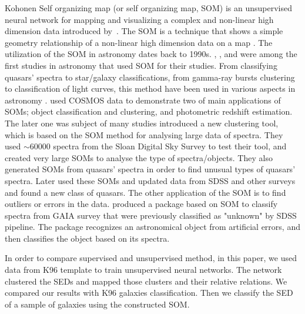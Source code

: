 Kohonen Self organizing map (or self organizing map, SOM) is an unsupervised neural network for mapping and visualizing a complex and non-linear high dimension data introduced by~\citep{Kohonen82}.
The SOM is a technique that shows a simple geometry relationship of a non-linear high dimension data on a map \citep{Kohonen98}.
The utilization of the SOM in astronomy dates back to 1990s. 
\citet[][]{Odewahn92}, \citet[][]{Hernandez94}, and \citet[][]{Murtagh95} were among the first studies in astronomy that used SOM for their studies.
From classifying quasars' spectra to star/galaxy classifications, from gamma-ray bursts clustering to classification of light curves, this method have been used in various aspects in astronomy \citep[e.g.][]{Maehoenen95, Miller96,Andreon00,Balastegui01,Rajaniemi02,Brett04,Scaringi09}.
\citet{Geach12} used COSMOS data to demonstrate two of main applications of SOMs; object classification and clustering, and photometric redshift estimation. 
The later one was subject of many studies \citep[e.g.][]{Kind14a}
\citet{In12} introduced a new clustering tool, which is based on the SOM method for analysing large data of spectra.
They used $\sim 60000$ spectra from the Sloan Digital Sky Survey \citep[SDSS;][]{Abazajian09}
to test their tool, and created very large SOMs to analyse the type of spectra/objects.
They also generated SOMs from quasars' spectra in order to find unusual types of quasars' spectra. Later \citet{Meusinger16} used these SOMs and updated data from SDSS and other surveys and found a new class of quasars.
The other application of the SOM is to find outliers or errors in the data.
\citet{Fustes13} produced a package based on SOM to classify spectra from GAIA survey that were previously classified as "unknown" by SDSS pipeline. The package recognizes an astronomical object from artificial errors, and then classifies the object based on its spectra.

In order to compare supervised and unsupervised method, in this paper, we used data from K96 template to train unsupervised neural networks. 
The network clustered the SEDs and mapped those clusters and their relative relations.
We compared our results with K96 galaxies classification.
Then we classify the SED of a sample of galaxies using the constructed SOM.
 
